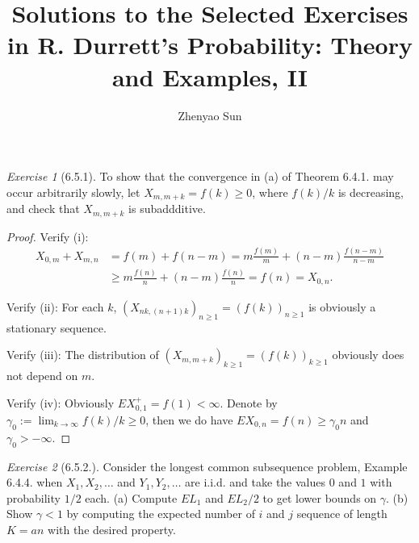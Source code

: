 \documentclass[12pt,a4paper]{amsart}
\theoremstyle{plain}
\theoremstyle{definition}
\theoremstyle{remark}
\newtheorem*{exe}{Exercise}
\numberwithin{equation}{section}
\begin{document}
\title
[Solutions]
{Solutions to the Selected Exercises in R. Durrett's Probability: Theory and Examples, II}
\author
[Z. Sun]
{Zhenyao Sun}
\address
{Zhenyao Sun\\
School of Mathematical Sciences\\
Peking University\\
Beijing, P. R. China, 100871}
\maketitle
\begin{exe}[6.5.1]
To show that the convergence in (a) of Theorem 6.4.1. may occur arbitrarily slowly, let $X_{m,m+k}=f(k)\geq 0$, where $f(k)/k$ is decreasing, and check that $X_{m,m+k}$ is subaddditive.
\end{exe}
\begin{proof}
Verify (i): 
\begin{align}
X_{0,m}+X_{m,n} 
&= f(m) + f(n-m)
= m \frac{f(m)}{m} + (n-m)  \frac{f(n-m)}{n-m} 
\\&\geq m \frac{f(n)}{n} + (n-m) \frac{f(n)}{n}
= f(n) 
= X_{0,n}.
\end{align}

Verify (ii): For each $k$, $(X_{nk,(n+1)k})_{n\geq 1}= (f(k))_{n\geq 1}$ is obviously a stationary sequence.

Verify (iii): The distribution of $(X_{m,m+k})_{k\geq 1} = (f(k))_{k\geq 1}$ obviously does not depend on $m$.

Verify (iv): Obviously $EX_{0,1}^+=f(1)<\infty$. 
Denote by $\gamma_0 := \lim_{k\to \infty} f(k)/k \geq 0$, then we do have $EX_{0,n}= f(n)\geq \gamma_0 n$ and $\gamma_0 > -\infty$. 
\end{proof}
\begin{exe}[6.5.2.]
Consider the longest common subsequence problem, Example 6.4.4. when $X_1,X_2,\dots$ and $Y_1,Y_2,\dots$ are i.i.d. and take the values $0$ and $1$ with probability $1/2$ each.
(a) Compute $EL_1$ and $EL_2/2$ to get lower bounds on $\gamma$.
(b) Show $\gamma < 1$ by computing the expected number of $i$ and $j$ sequence of length $K=an$ with the desired property. 
\end{exe}
\end{document}

